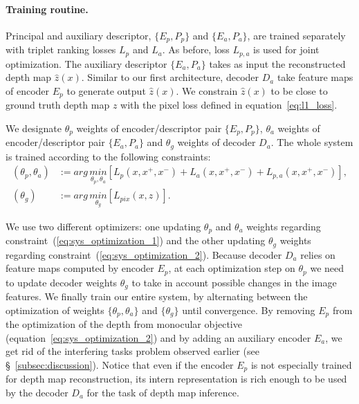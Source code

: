 \paragraph{Training routine.}
\label{subsec:training}
Principal and auxiliary descriptor, $\{E_p, P_p\}$ and $\{E_a, P_a\}$, are trained separately with triplet ranking losses $L_p$ and $L_a$. As before, loss $L_{p, a}$ is used for joint optimization. The auxiliary descriptor $\{E_a, P_a\}$ takes as input the reconstructed depth map $\hat{z}(x)$. Similar to our first architecture, decoder $D_a$ take feature maps of encoder $E_p$ to generate output $\hat{z}(x)$. We constrain $\hat{z}(x)$ to be close to ground truth depth map $z$ with the pixel loss defined in equation~\ref{eq:l1_loss}. 

We designate $\theta_p$ weights of encoder/descriptor pair $\{E_p, P_p\}$,  $\theta_a$ weights of encoder/descriptor pair $\{E_a, P_a\}$ and $\theta_g$ weights of decoder $D_a$. The whole system is trained according to the following constraints:
\begin{align}
	\left( \theta_{p}, \theta_{a} \right) & := arg\,\underset{\theta_p, \theta_a}{min} \left[ L_p(x, x^+, x^-) + L_a(x, x^+, x^-) + L_{p,a}(x, x^+, x^-) \right], \label{eq:sys_optimization_1} \\ 	
	\left( \theta_{g} \right) & := arg\,\underset{\theta_{g}}{min} \left[ L_{pix}(x, z) \right]. 	\label{eq:sys_optimization_2}
\end{align}

We use two different optimizers: one updating $\theta_{p}$ and $\theta_{a}$ weights regarding constraint~(\ref{eq:sys_optimization_1}) and the other updating $\theta_{g}$ weights regarding constraint~(\ref{eq:sys_optimization_2}). Because decoder $D_a$ relies on feature maps computed by encoder $E_p$, at each optimization step on $\theta_p$ we need to update decoder weights $\theta_g$ to take in account possible changes in the image features. We finally train our entire system, by alternating between the optimization of weights $\{\theta_p, \theta_a\}$ and $\{\theta_g\}$ until convergence. By removing $E_p$ from the optimization of the depth from monocular objective (equation~\ref{eq:sys_optimization_2}) and by adding an auxiliary encoder $E_a$, we get rid of the interfering tasks problem observed earlier (see \S~\ref{subsec:discussion}). Notice that even if the encoder $E_p$ is not especially trained for depth map reconstruction, its intern representation is rich enough to be used by the decoder $D_a$ for the task of depth map inference.

